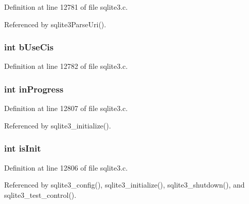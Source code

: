 Definition at line 12781 of file sqlite3.\+c.



Referenced by sqlite3\+Parse\+Uri().

\hypertarget{struct_sqlite3_config_a7491b8e0d85db8c5aa3c412487a4f31d}{}
\subsubsection[{b\+Use\+Cis}]{\setlength{\rightskip}{0pt plus 5cm}int b\+Use\+Cis}\label{struct_sqlite3_config_a7491b8e0d85db8c5aa3c412487a4f31d}


Definition at line 12782 of file sqlite3.\+c.

\hypertarget{struct_sqlite3_config_adbf46645b827d0c7b368e6b1298a196e}{}
\subsubsection[{in\+Progress}]{\setlength{\rightskip}{0pt plus 5cm}int in\+Progress}\label{struct_sqlite3_config_adbf46645b827d0c7b368e6b1298a196e}


Definition at line 12807 of file sqlite3.\+c.



Referenced by sqlite3\+\_\+initialize().

\hypertarget{struct_sqlite3_config_a6fbd614062a06fdd84bb4ba9d44c2028}{}
\subsubsection[{is\+Init}]{\setlength{\rightskip}{0pt plus 5cm}int is\+Init}\label{struct_sqlite3_config_a6fbd614062a06fdd84bb4ba9d44c2028}


Definition at line 12806 of file sqlite3.\+c.



Referenced by sqlite3\+\_\+config(), sqlite3\+\_\+initialize(), sqlite3\+\_\+shutdown(), and sqlite3\+\_\+test\+\_\+control().

\hypertarget{struct_sqlite3_config_ab3402c7fd0c57cc1383280eb49ebb159}{}
